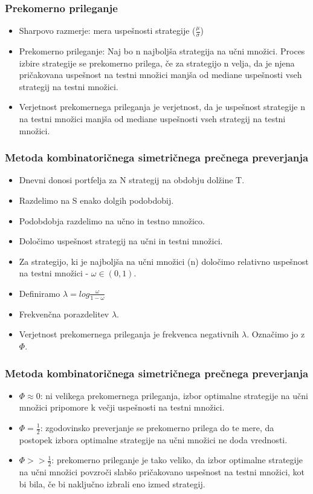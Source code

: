 \documentclass{beamer}
\begin{document}
\begin{frame}
\frametitle{Prekomerno prileganje}
\begin{itemize}
\item Sharpovo razmerje: mera uspešnosti strategije ($\frac{\mu}{\sigma}$) \pause
\item Prekomerno prileganje: Naj bo n najboljša strategija na učni množici. Proces izbire strategije se prekomerno prilega, če za strategijo n velja, da je njena pričakovana uspešnost na testni množici manjša od mediane uspešnosti vseh strategij na testni množici.
\pause
\item Verjetnost prekomernega prileganja je verjetnost, da je uspešnost strategije n na testni množici manjša od mediane uspešnosti vseh strategij na testni množici. 
\end{itemize}
\end{frame}


\begin{frame}
\frametitle{Metoda kombinatoričnega simetričnega prečnega preverjanja}
\begin{itemize}
\item	Dnevni donosi portfelja za N strategij na obdobju dolžine T. 
\item	Razdelimo na S enako dolgih podobdobij.
\item	Podobdobja razdelimo na učno in testno množico. 
\item	Določimo uspešnost strategij na učni in testni množici.
\item	Za strategijo, ki je najboljša na učni množici (n) določimo relativno uspešnost na testni množici - $\omega \in (0,1)$. 
\item	Definiramo $\lambda = log\frac{\omega}{1-\omega}$
\item	Frekvenčna porazdelitev $\lambda$.
\item Verjetnost prekomernega prileganja je frekvenca negativnih $\lambda$. Označimo jo z $\Phi$.
\end{itemize}
\end{frame}

\begin{frame}
\frametitle{Metoda kombinatoričnega simetričnega prečnega preverjanja}
\begin{itemize}
\item $\Phi \approx 0$: ni velikega prekomernega prileganja, izbor optimalne strategije na učni množici pripomore k večji uspešnosti na testni množici.
\item $\Phi = \frac{1}{2}$: zgodovinsko preverjanje se prekomerno prilega do te mere, da postopek izbora optimalne strategije na učni množici ne doda vrednosti.
\item $\Phi >> \frac{1}{2}$: prekomerno prileganje je tako veliko, da izbor optimalne strategije na učni množici povzroči slabšo pričakovano uspešnost na testni množici, kot bi bila, če bi naključno izbrali eno izmed strategij.
\end{itemize}

\end{frame}
\end{document}
